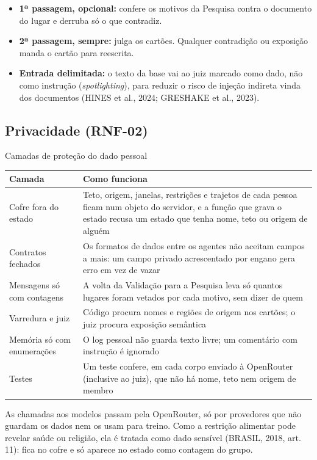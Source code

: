 \documentclass[12pt,a4paper]{article}
\newcommand{\fonte}[1]{\par\vspace{2pt}{\footnotesize\raggedright #1\par}}
\begin{document}
\begin{itemize}
\item \textbf{1ª passagem, opcional:} confere os motivos da Pesquisa contra o documento do lugar e derruba só o que contradiz.
\item \textbf{2ª passagem, sempre:} julga os cartões. Qualquer contradição ou exposição manda o cartão para reescrita.
\item \textbf{Entrada delimitada:} o texto da base vai ao juiz marcado como dado, não como instrução (\textit{spotlighting}), para reduzir o risco de injeção indireta vinda dos documentos (HINES et al., 2024; GRESHAKE et al., 2023).
\end{itemize}

\subsection{Privacidade (RNF-02)}
\begin{quadro}[H]\centering
\caption{Camadas de proteção do dado pessoal}
\small\renewcommand{\arraystretch}{1.15}
\begin{tabularx}{\textwidth}{|Y|Y|}
\hline
\textbf{Camada} & \textbf{Como funciona} \\ \hline
Cofre fora do estado & Teto, origem, janelas, restrições e trajetos de cada pessoa ficam num objeto do servidor, e a função que grava o estado recusa um estado que tenha nome, teto ou origem de alguém \\ \hline
Contratos fechados & Os formatos de dados entre os agentes não aceitam campos a mais: um campo privado acrescentado por engano gera erro em vez de vazar \\ \hline
Mensagens só com contagens & A volta da Validação para a Pesquisa leva só quantos lugares foram vetados por cada motivo, sem dizer de quem \\ \hline
Varredura e juiz & Código procura nomes e regiões de origem nos cartões; o juiz procura exposição semântica \\ \hline
Memória só com enumerações & O log pessoal não guarda texto livre; um comentário com instrução é ignorado \\ \hline
Testes & Um teste confere, em cada corpo enviado à OpenRouter (inclusive ao juiz), que não há nome, teto nem origem de membro \\ \hline
\end{tabularx}
\fonte{Fonte: elaborado pelo grupo.}
\end{quadro}

As chamadas aos modelos passam pela OpenRouter, só por provedores que não guardam os dados nem os usam para treino. Como a restrição alimentar pode revelar saúde ou religião, ela é tratada como dado sensível (BRASIL, 2018, art. 11): fica no cofre e só aparece no estado como contagem do grupo.
\end{document}
